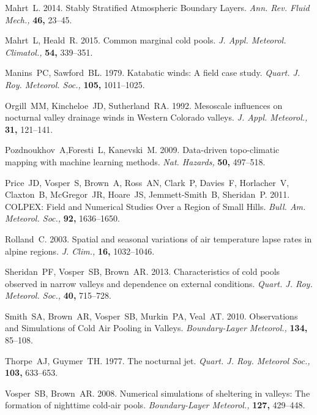\documentclass[times]{qjrms4}
\begin{document}
\begin{thebibliography}{99}
Mahrt~L. 2014. Stably Stratified Atmospheric Boundary Layers. \emph{Ann. Rev. Fluid Mech.,} {\bf 46,} 23--45.

Mahrt~L, Heald~R. 2015. Common marginal cold pools. \emph{J. Appl. Meteorol. Climatol.,} {\bf 54,} 339--351.

Manins~PC, Sawford~BL. 1979. Katabatic winds: A field case study. \emph{Quart. J. Roy. Meteorol. Soc.,} {\bf 105,} 1011--1025.

Orgill~MM, Kincheloe~JD, Sutherland~RA. 1992. Mesoscale influences on nocturnal valley drainage winds in Western Colorado valleys. \emph{J. Appl. Meteorol.,} {\bf 31,} 121--141.

Pozdnoukhov~A,Foresti~L, Kanevski~M. 2009. Data-driven topo-climatic mapping with machine learning methods. \emph{Nat. Hazards,} {\bf 50,} 497--518. 

Price~JD, Vosper~S, Brown~A, Ross~AN, Clark~P, Davies~F, Horlacher~V, Claxton~B, McGregor~JR, Hoare~JS, Jemmett-Smith~B, Sheridan~P. 2011. COLPEX: Field and Numerical Studies Over a Region of Small Hills. \emph{Bull. Am. Meteorol. Soc.,} {\bf 92,} 1636--1650.

Rolland~C. 2003. Spatial and seasonal variations of air temperature lapse rates in alpine regions. \emph{J. Clim.,} {\bf 16,} 1032--1046.

Sheridan~PF, Vosper~SB, Brown~AR. 2013. Characteristics of cold pools observed in narrow valleys and dependence on external conditions. \emph{Quart. J. Roy. Meteorol. Soc.,} {\bf 40,} 715–728.

Smith~SA, Brown~AR, Vosper~SB, Murkin~PA, Veal~AT. 2010. Observations and Simulations of Cold Air Pooling in Valleys. \emph{Boundary-Layer Meteorol.,} {\bf 134,} 85--108.

Thorpe~AJ, Guymer~TH. 1977. The nocturnal jet. \emph{Quart. J. Roy. Meteorol Soc.,} {\bf 103,} 633--653.

Vosper~SB, Brown~AR. 2008. Numerical simulations of sheltering in valleys: The formation of nighttime cold-air pools. \emph{Boundary-Layer Meteorol.,} {\bf 127,} 429--448.


\end{thebibliography}
\end{document}
